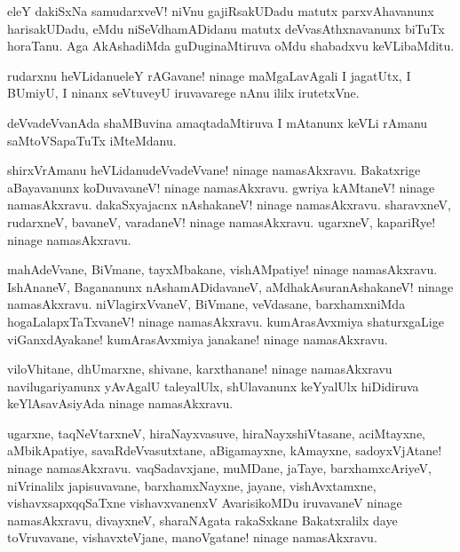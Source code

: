 \begin{mng}
eleY dakiSxNa samudarxveV! niVnu gajiRsakUDadu matutx parxvAhavanunx harisakUDadu, eMdu niSeVdhamADidanu matutx deVvasAthxnavanunx biTuTx horaTanu. Aga AkAshadiMda guDuginaMtiruva oMdu shabadxvu keVLibaMditu.
\end{mng}

\begin{mng}
rudarxnu heVLidanu\mdash eleY rAGavane! ninage maMgaLavAgali I jagatUtx, I BUmiyU, I ninanx seVtuveyU iruvavarege nAnu ililx irutetxVne.
\end{mng}

\begin{mng}
deVvadeVvanAda shaMBuvina amaqtadaMtiruva I mAtanunx keVLi rAmanu saMtoVSapaTuTx iMteMdanu.
\end{mng}

\begin{mng}
shirxVrAmanu heVLidanu\mdash deVvadeVvane! ninage namasAkxravu. Bakatxrige aBayavanunx koDuvavaneV! ninage namasAkxravu. gwriya kAMtaneV! ninage namasAkxravu. dakaSxyajacnx nAshakaneV! ninage namasAkxravu. sharavxneV, rudarxneV, bavaneV, varadaneV! ninage namasAkxravu. ugarxneV, kapariRye! ninage namasAkxravu.
\end{mng}

\begin{mng}
mahAdeVvane, BiVmane, tayxMbakane, vishAMpatiye! ninage namasAkxravu. IshAnaneV, Bagananunx nAshamADidavaneV, aMdhakAsuranAshakaneV! ninage namasAkxravu. niVlagirxVvaneV, BiVmane, veVdasane, barxhamxniMda hogaLalapxTaTxvaneV! ninage namasAkxravu. kumArasAvxmiya shaturxgaLige viGanxdAyakane! kumArasAvxmiya janakane! ninage namasAkxravu.
\end{mng}

\begin{mng}
viloVhitane, dhUmarxne, shivane, karxthanane! ninage namasAkxravu navilugariyanunx yAvAgalU taleyalUlx, shUlavanunx keYyalUlx hiDidiruva keYlAsavAsiyAda ninage namasAkxravu.
\end{mng}

\begin{mng}
ugarxne, taqNeVtarxneV, hiraNayxvasuve, hiraNayxshiVtasane, aciMtayxne, aMbikApatiye, savaRdeVvasutxtane, aBigamayxne, kAmayxne, sadoyxVjAtane! ninage namasAkxravu. vaqSadavxjane, muMDane, jaTaye, barxhamxcAriyeV, niVrinalilx japisuvavane, barxhamxNayxne, jayane, vishAvxtamxne, vishavxsapxqqSaTxne vishavxvanenxV AvarisikoMDu iruvavaneV ninage namasAkxravu, divayxneV, sharaNAgata rakaSxkane Bakatxralilx daye toVruvavane, vishavxteVjane, manoVgatane! ninage namasAkxravu.
\end{mng}

